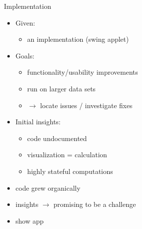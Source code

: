 \documentclass[
  size=9pt,
  style=klope,
  paper=screen,
  mode=print,
  display=slides,
  nohandoutpagebreaks,
  pauseslide,
  hlsections,
  fleqn,
  dvips,
  clock
]{powerdot}
\begin{document}
\begin{slide}{Implementation}
  \begin{itemize}
    \item Given:
    \begin{itemize}
      \item an implementation (swing applet)
    \end{itemize}
    \item Goals:
    \begin{itemize}
      \item functionality/usability improvements
      \item run on larger data sets
      \item $\rightarrow$ locate issues / investigate fixes
    \end{itemize}
    \item Initial insights:
    \begin{itemize}
      \item code undocumented
      \item visualization = calculation
      \item highly stateful computations
    \end{itemize}
  \end{itemize}
\end{slide}
\begin{note}{}
  \begin{itemize}
    \item code grew organically
    \item insights $\rightarrow$ promising to be a challenge
    \item show app
  \end{itemize}
\end{note}
\end{document}

